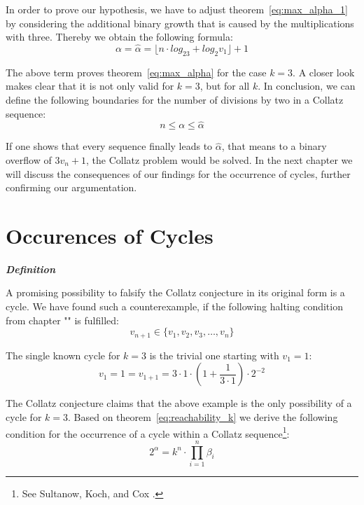 \documentclass{SciPress_2015}
\renewcommand{\subsection}[1]{\textit{\textbf{#1}}}
\begin{document}
\par\medskip
In order to prove our hypothesis, we have to adjust theorem~\ref{eq:max_alpha_1} by considering the additional binary growth that is caused by the multiplications with three. Thereby we obtain the following formula:
\begin{equation}
\label{eq:max_alpha_k}
	\alpha=\hat\alpha=\lfloor n\cdot log_23+log_2v_1\rfloor+1
\end{equation}

The above term proves theorem~\ref{eq:max_alpha} for the case $k=3$. A closer look makes clear that it is not only valid for $k=3$, but for all $k$. In conclusion, we can define the following boundaries for the number of divisions by two in a Collatz sequence:
\begin{equation}
n\le\alpha\le\hat\alpha
\end{equation}

If one shows that every sequence finally leads to $\hat\alpha$, that means to a binary overflow of $3v_n+1$, the Collatz problem would be solved. In the next chapter we will discuss the consequences of our findings for the occurrence of cycles, further confirming our argumentation.

\section{Occurences of Cycles}
\subsection{Definition}
\par\noindent
A promising possibility to falsify the Collatz conjecture in its original form is a cycle. We have found such a counterexample, if the following halting condition from chapter "" is fulfilled:
\[
v_{n+1}\in\{v_1,v_2,v_3,\ldots,v_n\}
\]
\par\noindent
The single known cycle for $k=3$ is the trivial one starting with $v_1=1$:
\begin{equation}
\label{eq:cycle}
	v_1=1=v_{1+1}=3\cdot1\cdot\left(1+\frac{1}{3\cdot1}\right)\cdot2^{-2}
\end{equation}

The Collatz conjecture claims that the above example is the only possibility of a cycle for $k=3$. Based on theorem~\ref{eq:reachability_k} we derive the following condition for the occurrence of a cycle within a Collatz sequence\footnote{See Sultanow, Koch, and Cox \cite[p.~11]{Ref_Sultanow_Koch_Cox_2020}.}:
\[
2^{\alpha}=k^n\cdot\prod_{i=1}^{n}\beta_i
\]
\end{document}

